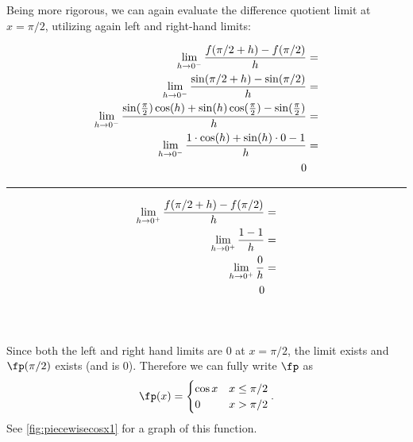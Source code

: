 \begin{example}
Being more rigorous, we can again evaluate the difference quotient limit at $x=\pi/2$, utilizing again left and right-hand limits:\\
{\small{}
\noindent\begin{minipage}{.59\linewidth}
\begin{align*}
\lim_{h\to0^-}\frac{f(\pi/2+h)-f(\pi/2)}{h} =\\
\lim_{h\to0^-}\frac{\sin(\pi/2+h)-\sin(\pi/2)}{h}=\\
\lim_{h\to0^-}{ \frac{\sin(\frac{\pi}{2})\cos(h)+\sin(h)\cos(\frac{\pi}{2})-\sin(\frac{\pi}{2})}{h}}=\\
\lim_{h\to0^-}\frac{1\cdot\cos(h)+\sin(h)\cdot 0-1}{h} =\\
0\hphantom{{}=}
\end{align*}
\end{minipage}%
\begin{minipage}{1pt}
 \rule{.5pt}{100pt}%
\end{minipage}%
\begin{minipage}{.39\linewidth}
\begin{align*}
\lim_{h\to0^+}\frac{f(\pi/2+h)-f(\pi/2)}{h} =\\
\lim_{h\to0^+}\frac{1-1}{h}=\\
\lim_{h\to0^+}\frac{0}{h}=\\
0\hphantom{{}=}\\
\phantom{0}\\
\phantom{0}
\end{align*}
\end{minipage}
}


Since both the left and right hand limits are 0 at $x=\pi/2$, the limit exists and $\fp(\pi/2)$ exists (and is 0). Therefore we can fully write $\fp$ as
\[\fp(x) = \begin{cases}\cos x & x\leq\pi/2\\ 0 & x>\pi/2\end{cases}.\]
See \autoref{fig:piecewisecosx1} for a graph of this function.
\end{example}

